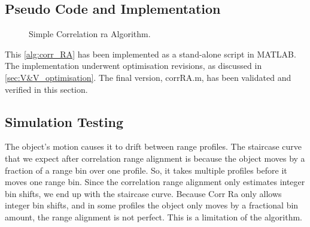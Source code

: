 \documentclass[class=report,11pt,crop=false]{standalone}
\begin{document}
    \subsection{Pseudo Code and Implementation}
    \begin{figure}[ht]
      \vspace{0.5cm}
      \centering
      \captionsetup{type=figure}
      \begin{minipage}{.7\linewidth}
        \begin{algorithm}[h]
            \caption{Simple Correlation \gls{ra} Algorithm.\label{alg:corr_RA}}
    
            \DontPrintSemicolon
            \SetAlgoLined
    
    
            \BlankLine
          \vspace{0.5cm}
        \end{algorithm}
      \end{minipage}
    \end{figure}

    This \autoref{alg:corr_RA} has been implemented as a stand-alone script in \textsc{MATLAB}. The implementation underwent optimisation revisions, as discussed in \autoref{sec:V&V_optimisation}. The final version, corrRA.m, has been validated and verified in this section.
    
    \subsection{Simulation Testing}
    The object's motion causes it to drift between range profiles. The staircase curve that we expect after correlation range alignment is because the object moves by a fraction of a range bin over one profile. So, it takes multiple profiles before it moves one range bin. Since the correlation range alignment only estimates integer bin shifts, we end up with the staircase curve. 
    Because Corr Ra only allows integer bin shifts, and in some profiles the object only moves by a fractional bin amount, the range alignment is not perfect. This is a limitation of the algorithm.
\end{document}
